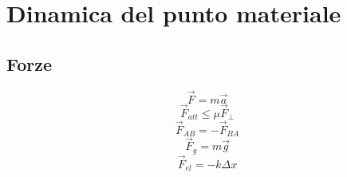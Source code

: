 \documentclass[../../fisica]{subfiles}
\begin{document}
    \chapter{Dinamica del punto materiale}

        \section*{Forze}
        
            \[ \vec{F} = m \vec{a}  \] %
            \[ \vec{F}_{att} \leq \mu \vec{F}_{\perp}  \]
            \[ \vec{F}_{AB} = - \vec{F}_{BA}  \] %
            \[ \vec{F}_{g} = m \vec{g}  \] %
            \[ \vec{F}_{el} = - k \Delta x  \]
        
\end{document}
